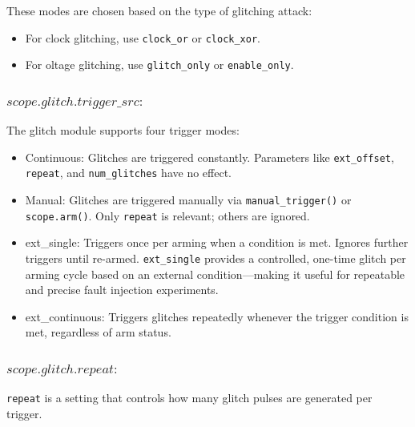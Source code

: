 These modes are chosen based on the type of glitching attack:
\begin{itemize}
    \item For clock glitching, use \texttt{clock\_or} or \texttt{clock\_xor}.
    \item For oltage glitching, use \texttt{glitch\_only} or \texttt{enable\_only}.
  \end{itemize}

\subsubsection{$scope.glitch.trigger\_src :$}    
The glitch module supports four trigger modes:

\begin{itemize}
    \item Continuous: Glitches are triggered constantly. Parameters like \texttt{ext\_offset}, \texttt{repeat}, and \texttt{num\_glitches} have no effect.
    
    \item Manual: Glitches are triggered manually via \texttt{manual\_trigger()} or \texttt{scope.arm()}. Only \texttt{repeat} is relevant; others are ignored.
    
    \item ext\_single: Triggers once per arming when a condition is met. Ignores further triggers until re-armed. \texttt{ext\_single} provides a controlled, one-time glitch per arming cycle based on an external condition—making it useful for repeatable and precise fault injection experiments.
    
    \item ext\_continuous: Triggers glitches repeatedly whenever the trigger condition is met, regardless of arm status.
\end{itemize}
\subsubsection{$scope.glitch.repeat :$}
\texttt{repeat} is a setting that controls how many glitch pulses are generated per trigger.

